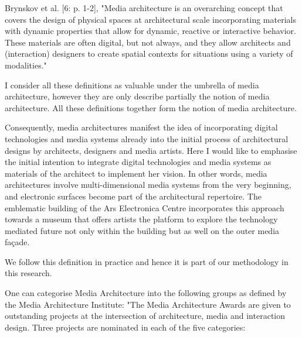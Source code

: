Brynskov et al. [6: p. 1-2], "Media architecture is an overarching concept that covers the design of physical spaces at architectural scale incorporating materials with dynamic properties that allow for dynamic, reactive or interactive behavior. These materials are often digital, but not always, and they allow architects and (interaction) designers to create spatial contexts for situations using a variety of modalities."


I consider all these definitions as valuable under the umbrella of media architecture, however they are only describe partially the notion of media architecture. All these definitions together form the notion of media architecture. 

Consequently, media architectures manifest the idea of incorporating digital technologies and media systems already into the initial process of architectural designs by architects, designers and media artists. Here I would like to emphasise the initial intention to integrate digital technologies and media systems as materials of the architect to implement her vision. In other words, media architectures involve multi-dimensional media systems from the very beginning, and electronic surfaces become part of the architectural repertoire. The emblematic building of the Ars Electronica Centre incorporates this approach towards a museum that offers artists the platform to explore the technology mediated future not only within the building but as well on the outer media façade. 

We follow this definition in practice and hence it is part of our methodology in this research.


One can categorise Media Architecture into the following groups as defined by the Media Architecture Institute:
"The Media Architecture Awards are given to outstanding projects at the intersection of architecture, media and interaction design. Three projects are nominated in each of the five categories:


